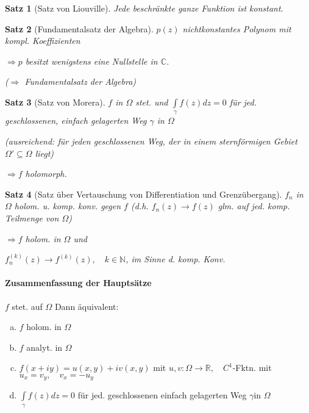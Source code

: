 \documentclass[ngerman,halfparskip]{scrartcl}
\newtheorem*{satz*}{Satz}
\theoremstyle{definition}
\def\R{\mathbb R}
\def\C{\mathbb C}
\def\N{\mathbb N}
\begin{document}
\begin{satz*}[Satz von Liouville]
Jede beschränkte ganze Funktion ist konstant.
\end{satz*}

\begin{satz*}[Fundamentalsatz der Algebra] $p(z)$ nichtkonstantes Polynom mit kompl. Koeffizienten

$\Rightarrow p$ besitzt wenigstens eine Nullstelle in $\C$. 

($\Rightarrow$ Fundamentalsatz der Algebra)

\end{satz*}

\begin{satz*}[Satz von Morera]

$f$ in $\Omega$ stet. und $\int\limits_\gamma f(z)dz=0 $ für jed. geschlossenen, einfach gelagerten Weg $\gamma$ in $\Omega$ 

(ausreichend: für jeden geschlossenen Weg, der in einem sternförmigen Gebiet $\Omega'\subseteq\Omega$ liegt)

$\Rightarrow f$ holomorph.

\end{satz*}

\begin{satz*}[Satz über Vertauschung von Differentiation und Grenzübergang]
$f_n$ in $\Omega$ holom. u. komp. konv. gegen $f$ (d.h. $f_n(z)\rightarrow f(z)$ glm. auf jed. komp. Teilmenge von $\Omega$)

$\Rightarrow f$ holom. in $\Omega$ und

$f_n^{(k)}(z)\rightarrow f^{(k)}(z), \quad k\in\N$, im Sinne d. komp. Konv.
\end{satz*}

\paragraph{Zusammenfassung der Hauptsätze}$f$ stet. auf $\Omega$ Dann äquivalent:
\begin{enumerate}[a)]
\item $f$ holom. in $\Omega$
\item $f$ analyt. in $\Omega$
\item $f(x+iy)=u(x,y)+iv(x,y)$ mit $u,v:\Omega\rightarrow \R, \quad C^1$-Fktn. mit $u_x=v_y, \quad v_x=-u_y$
\item $\int\limits_\gamma f(z)dz=0$ für jed. geschlossenen einfach gelagerten Weg $\gamma $in $\Omega$ 
\end{enumerate}
\end{document}
